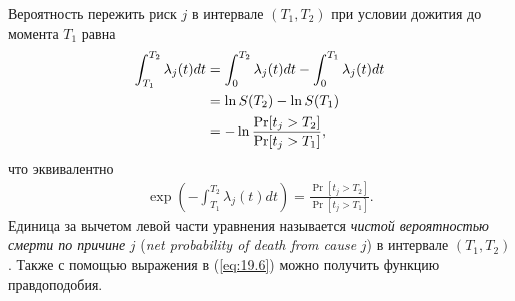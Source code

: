 Вероятность пережить риск %
$j$ в интервале $(T_1, T_2)$ при условии дожития до момента $T_1$ равна
    \begin{align}
    \label{eq:19.5}
    \int_{T_1}^{T_2} \lambda_j(t)dt     &= \int_{0}^{T_2} \lambda_j(t)dt - \int_{0}^{T_1} \lambda_j(t)dt \\
                                        &= \ln S(T_2) - \ln S(T_1) \notag \\
                                        &= - \ln \frac{\Pr [t_j > T_2]}{\Pr [t_j > T_1]}, \notag
    \end{align}
что эквивалентно
    \begin{align}
    \label{eq:19.6}
    \exp{\left( - \int_{T_1}^{T_2} \lambda_j(t)dt \right)} = \frac{\Pr [t_j > T_2]}{\Pr [t_j > T_1]}.
    \end{align}
Единица за вычетом левой части уравнения называется \textit{чистой вероятностью смерти по причине} $j$ (\textit{net probability of death from cause} $j$) в интервале $(T_1, T_2)$. Также с помощью выражения в (\ref{eq:19.6}) можно получить функцию правдоподобия.


